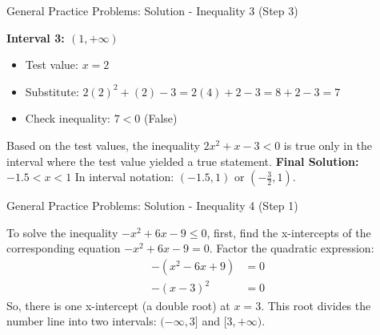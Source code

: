 \documentclass[aspectratio=169]{beamer}
\begin{document}
\begin{frame}{General Practice Problems: Solution - Inequality 3 (Step 3)}
    \begin{tcolorbox}[colback=lightgray,colframe=accent,title=Solution: $2x^2 + x - 3 < 0$ (Step 3 - Final Solution)]
        \footnotesize
        \textbf{Interval 3: $(1, +\infty)$}
        \begin{itemize}
            \item Test value: $x=2$
            \item Substitute: $2(2)^2 + (2) - 3 = 2(4) + 2 - 3 = 8 + 2 - 3 = 7$
            \item Check inequality: $7 < 0$ (False)
        \end{itemize}
        \newline
        Based on the test values, the inequality $2x^2 + x - 3 < 0$ is true only in the interval where the test value yielded a true statement.
        \newline
        \textbf{Final Solution:} $-1.5 < x < 1$
        \newline
        In interval notation: $(-1.5, 1)$ or $(-\frac{3}{2}, 1)$.
    \end{tcolorbox}
\end{frame}

\begin{frame}{General Practice Problems: Solution - Inequality 4 (Step 1)}
    \begin{tcolorbox}[colback=lightgray,colframe=accent,title=Solution: $-x^2 + 6x - 9 \leq 0$ (Step 1 - Find X-intercepts)]
        \footnotesize
        To solve the inequality $-x^2 + 6x - 9 \leq 0$, first, find the x-intercepts of the corresponding equation $-x^2 + 6x - 9 = 0$.
        Factor the quadratic expression:
        \begin{align*}
            -(x^2 - 6x + 9) &= 0 \\
            -(x-3)^2 &= 0
        \end{align*}
        So, there is one x-intercept (a double root) at $x=3$.
        This root divides the number line into two intervals: $(-\infty, 3]$ and $[3, +\infty)$.
    \end{tcolorbox}
\end{frame}
\end{document}
